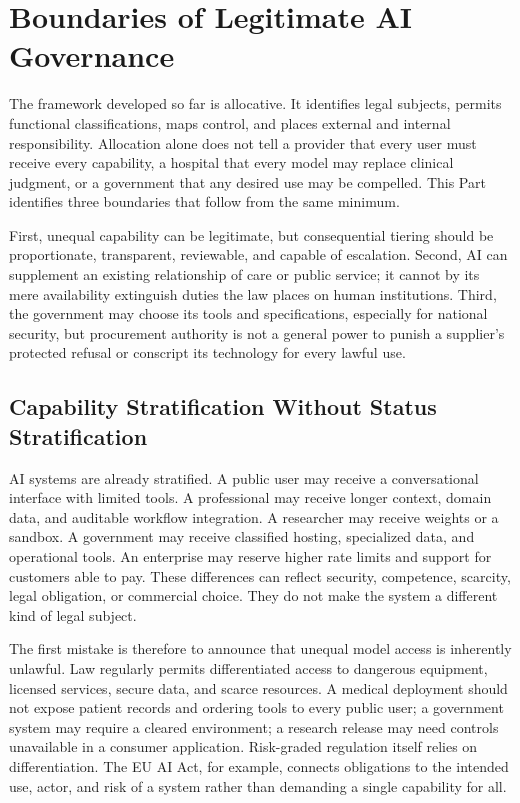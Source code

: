 \section{Boundaries of Legitimate AI Governance}
\label{sec:boundaries}

The framework developed so far is allocative. It identifies legal subjects, permits functional classifications, maps control, and places external and internal responsibility. Allocation alone does not tell a provider that every user must receive every capability, a hospital that every model may replace clinical judgment, or a government that any desired use may be compelled. This Part identifies three boundaries that follow from the same minimum.

First, unequal capability can be legitimate, but consequential tiering should be proportionate, transparent, reviewable, and capable of escalation. Second, AI can supplement an existing relationship of care or public service; it cannot by its mere availability extinguish duties the law places on human institutions. Third, the government may choose its tools and specifications, especially for national security, but procurement authority is not a general power to punish a supplier's protected refusal or conscript its technology for every lawful use.

\subsection{Capability Stratification Without Status Stratification}

AI systems are already stratified. A public user may receive a conversational interface with limited tools. A professional may receive longer context, domain data, and auditable workflow integration. A researcher may receive weights or a sandbox. A government may receive classified hosting, specialized data, and operational tools. An enterprise may reserve higher rate limits and support for customers able to pay. These differences can reflect security, competence, scarcity, legal obligation, or commercial choice. They do not make the system a different kind of legal subject.

The first mistake is therefore to announce that unequal model access is inherently unlawful. Law regularly permits differentiated access to dangerous equipment, licensed services, secure data, and scarce resources. A medical deployment should not expose patient records and ordering tools to every public user; a government system may require a cleared environment; a research release may need controls unavailable in a consumer application. Risk-graded regulation itself relies on differentiation. The EU AI Act, for example, connects obligations to the intended use, actor, and risk of a system rather than demanding a single capability for all.

